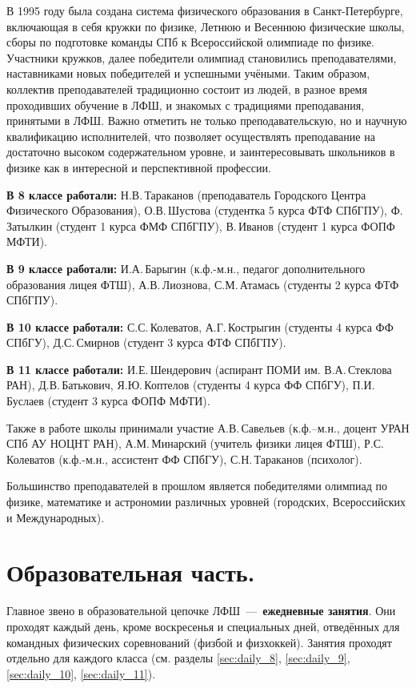 \documentclass[12pt,a4paper,oneside,draft]{scrartcl}
\begin{document}
В 1995 году была создана система физического образования в
Санкт-Петербурге, включающая в себя кружки по физике, Летнюю и
Весеннюю физические школы, сборы по подготовке команды СПб к
Всероссийской олимпиаде по физике. Участники кружков, далее победители
олимпиад становились преподавателями, наставниками новых победителей и
успешными учёными. Таким образом, коллектив преподавателей традиционно
состоит из людей, в разное время проходивших обучение в ЛФШ, и
знакомых с традициями преподавания, принятыми в ЛФШ. Важно отметить не
только преподавательскую, но и научную квалификацию исполнителей, что
позволяет осуществлять преподавание на достаточно высоком
содержательном уровне, и заинтересовывать школьников в физике как в
интересной и перспективной профессии.

\textbf{В 8 классе работали:} Н.В.\,Тараканов (преподаватель Городского Центра
Физического Образования), О.В.\,Шустова (студентка 5 курса ФТФ СПбГПУ),
Ф.\,Затылкин (студент 1 курса ФМФ СПбГПУ), В.\,Иванов (студент 1 курса
ФОПФ МФТИ).

\textbf{В 9 классе работали:} И.А.\,Барыгин (к.ф.-м.н., педагог дополнительного
образования лицея ФТШ), А.В.\,Лиознова, С.М.\,Атамась (студенты 2 курса
ФТФ СПбГПУ).

\textbf{В 10 классе работали:} С.С.\,Колеватов, А.Г.\,Кострыгин (студенты 4
курса ФФ СПбГУ), Д.С.\,Смирнов (студент 3 курса ФТФ СПбГПУ).

\textbf{В 11 классе работали:} И.Е.\,Шендерович (аспирант ПОМИ
им. В.А.\,Стеклова РАН), Д.В.\,Батькович, Я.Ю.\,Коптелов (студенты 4 курса
ФФ СПбГУ), П.И.\,Буслаев (студент 3 курса ФОПФ МФТИ).

Также в работе школы принимали участие А.В.\,Савельев (к.ф.–м.н.,
доцент УРАН СПб АУ НОЦНТ РАН), А.М.\,Минарский (учитель физики лицея
ФТШ), Р.С.\,Колеватов (к.ф.-м.н., ассистент ФФ СПбГУ), С.Н.\,Тараканов
(психолог).

Большинство преподавателей в прошлом является победителями олимпиад по
физике, математике и астрономии различных уровней (городских,
Всероссийских и Международных).

\section{Образовательная часть.}
\label{sec:science}

Главное звено в образовательной цепочке ЛФШ~---~\textbf{ежедневные
занятия}. Они проходят каждый день, кроме воскресенья и специальных
дней, отведённых для командных физических соревнований (физбой и
физхоккей). Занятия проходят отдельно для каждого класса
(см. разделы \ref{sec:daily_8}, \ref{sec:daily_9}, \ref{sec:daily_10},
\ref{sec:daily_11}). 
\end{document}
